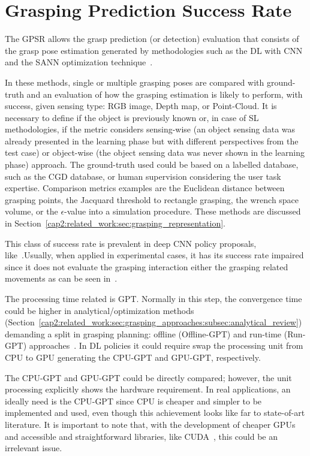 \section{Grasping Prediction Success Rate}
\label{cap3:grasping_eval:sec:gpsr}

The \ac{GPSR} allows the grasp prediction (or detection) evaluation that consists of the grasp pose estimation generated by methodologies such as the \ac{DL} with \ac{CNN}~\cite{Mahler2019} and the \ac{SANN} optimization technique~\cite{AndrewT2004,carvalho2020}.

In these methods, single or multiple grasping poses are compared with ground-truth and an evaluation of how the grasping estimation is likely to perform, with success, given sensing type: RGB image, Depth map, or Point-Cloud. It is necessary to define if the object is previously known or, in case of \ac{SL} methodologies, if the metric considers sensing-wise (an object sensing data was already presented in the learning phase but with different perspectives from the test case) or object-wise (the object sensing data was never shown in the learning phase) approach. The ground-truth used could be based on a labelled database, such as the \ac{CGD} database, or human supervision considering the user task expertise. Comparison metrics examples are the Euclidean distance between grasping points, the Jacquard threshold to rectangle grasping, the wrench space volume, or the $\epsilon$-value into a simulation procedure. These methods are discussed in Section~\ref{cap2:related_work:sec:grasping_representation}.

This class of success rate is prevalent in deep \ac{CNN} policy proposals, like~\cite{Redmon2015,Kumra2017,asif2018ensemblenet,song2020novel}.Usually, when applied in experimental cases, it has its success rate impaired since it does not evaluate the grasping interaction either the grasping related movements as can be seen in~\cite{Chu2018}.

The processing time related is \ac{GPT}. Normally in this step, the convergence time could be higher in analytical/optimization methods (Section~\ref{cap2:related_work:sec:grasping_approaches:subsec:analytical_review}) demanding a split in grasping planning: offline (\ac{Offline-GPT}) and run-time (\ac{Run-GPT}) approaches~\cite{carvalho2020}. In \ac{DL} policies it could require swap the processing unit from \ac{CPU} to \ac{GPU} generating the \ac{CPU-GPT} and \ac{GPU-GPT}, respectively.

The \ac{CPU-GPT} and \ac{GPU-GPT} could be directly compared; however, the unit processing explicitly shows the hardware requirement. In real applications, an ideally need is the \ac{CPU-GPT}  since \ac{CPU} is cheaper and simpler to be implemented and used, even though this achievement looks like far to state-of-art literature. It is important to note that, with the development of cheaper \acp{GPU} and accessible and straightforward libraries, like CUDA~\cite{cuda}, this could be an irrelevant issue.


